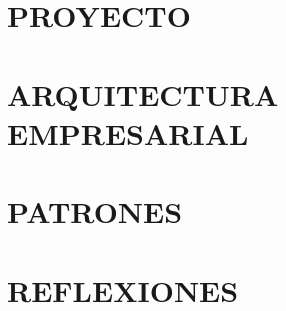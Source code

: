 \documentclass[a4paper,12pt]{report}
\begin{document}
    \maketitle
    \tableofcontents

    \part{PROYECTO}
    
    

    \part{ARQUITECTURA EMPRESARIAL}
    
    
    
    
    
    

    \part{PATRONES}
    
    
    

    \part{REFLEXIONES}
    
    
    \printbibliography
\end{document}
